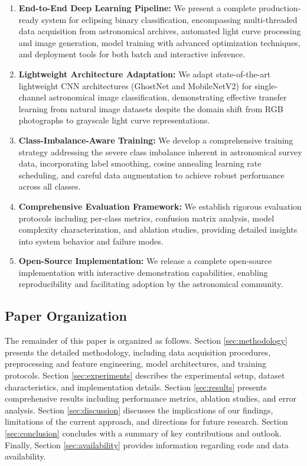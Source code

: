 \documentclass[11pt,a4paper]{article}
\begin{document}
\begin{enumerate}
    \item \textbf{End-to-End Deep Learning Pipeline:} We present a complete production-ready system for eclipsing binary classification, encompassing multi-threaded data acquisition from astronomical archives, automated light curve processing and image generation, model training with advanced optimization techniques, and deployment tools for both batch and interactive inference.
    
    \item \textbf{Lightweight Architecture Adaptation:} We adapt state-of-the-art lightweight CNN architectures (GhostNet and MobileNetV2) for single-channel astronomical image classification, demonstrating effective transfer learning from natural image datasets despite the domain shift from RGB photographs to grayscale light curve representations.
    
    \item \textbf{Class-Imbalance-Aware Training:} We develop a comprehensive training strategy addressing the severe class imbalance inherent in astronomical survey data, incorporating label smoothing, cosine annealing learning rate scheduling, and careful data augmentation to achieve robust performance across all classes.
    
    \item \textbf{Comprehensive Evaluation Framework:} We establish rigorous evaluation protocols including per-class metrics, confusion matrix analysis, model complexity characterization, and ablation studies, providing detailed insights into system behavior and failure modes.
    
    \item \textbf{Open-Source Implementation:} We release a complete open-source implementation with interactive demonstration capabilities, enabling reproducibility and facilitating adoption by the astronomical community.
\end{enumerate}

\subsection{Paper Organization}

The remainder of this paper is organized as follows. Section \ref{sec:methodology} presents the detailed methodology, including data acquisition procedures, preprocessing and feature engineering, model architectures, and training protocols. Section \ref{sec:experiments} describes the experimental setup, dataset characteristics, and implementation details. Section \ref{sec:results} presents comprehensive results including performance metrics, ablation studies, and error analysis. Section \ref{sec:discussion} discusses the implications of our findings, limitations of the current approach, and directions for future research. Section \ref{sec:conclusion} concludes with a summary of key contributions and outlook. Finally, Section \ref{sec:availability} provides information regarding code and data availability.
\end{document}
